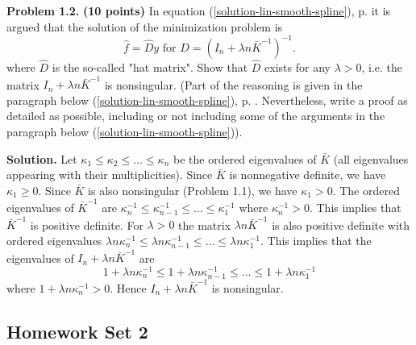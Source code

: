 \documentclass[11pt,twoside]{article}%
\theoremstyle{change}
\newenvironment{quote-env}{\begin{quote}\sffamily }{\end{quote}}
\newenvironment{mycomments-env}[1][Mycomments]{\textbf{#1.} \begin{quote-env} }{ \end{quote-env}  \ \rule{0.5em}{0.5em}}
\begin{document}
\textbf{Problem 1.2.} \textbf{(10 points) }In equation
(\ref{solution-lin-smooth-spline}), p. \pageref{solution-lin-smooth-spline} it
is argued that the solution of the minimization problem is
\[
\hat{f}=\hat{D}y\text{ for }\hat{D}=\left(  I_{n}+\lambda n\bar{K}%
^{-1}\right)  ^{-1}.
\]
where $\hat{D}$ is the so-called "hat matrix". Show that $\hat{D}$ exists for
any $\lambda>0$, i.e. the matrix $I_{n}+\lambda n\bar{K}^{-1}$ is nonsingular.
(Part of the reasoning is given in the paragraph below
(\ref{solution-lin-smooth-spline}), p. \pageref{solution-lin-smooth-spline}.
Nevertheless, write a proof as detailed as possible, including or not
including some of the arguments in the paragraph below
(\ref{solution-lin-smooth-spline})).%

\begin{mycomments}%


\begin{mycomments-env}
\textbf{Solution. }Let $\kappa_{1}\leq\kappa_{2}\leq\ldots\leq\kappa_{n}$ be
the ordered eigenvalues of $\bar{K}$ (all eigenvalues appearing with their
multiplicities). Since $\bar{K}$ is nonnegative definite, we have $\kappa
_{1}\geq0$. Since $\bar{K}$ is also nonsingular (Problem 1.1), we have
$\kappa_{1}>0$. The ordered eigenvalues of $\bar{K}^{-1}$ are $\kappa_{n}%
^{-1}\leq\kappa_{n-1}^{-1}\leq\ldots\leq\kappa_{1}^{-1}$ where $\kappa
_{n}^{-1}>0$. This implies that $\bar{K}^{-1}$ is positive definite. For
$\lambda>0$ the matrix $\lambda n\bar{K}^{-1}$ is also positive definite with
ordered eigenvalues $\lambda n\kappa_{n}^{-1}\leq\lambda n\kappa_{n-1}%
^{-1}\leq\ldots\leq\lambda n\kappa_{1}^{-1}$. This implies that the
eigenvalues of $I_{n}+\lambda n\bar{K}^{-1}$ are
\[
1+\lambda n\kappa_{n}^{-1}\leq1+\lambda n\kappa_{n-1}^{-1}\leq\ldots
\leq1+\lambda n\kappa_{1}^{-1}%
\]
where $1+\lambda n\kappa_{n}^{-1}>0.$ Hence $I_{n}+\lambda n\bar{K}^{-1}$ is nonsingular.
\end{mycomments-env}%

\end{mycomments}%


\bigskip

\subsection{Homework Set 2\textbf{\ }}
\end{document}
